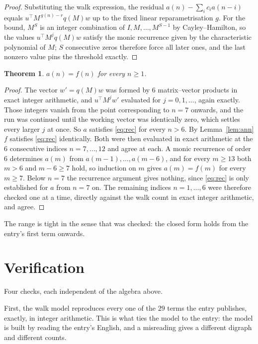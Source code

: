 \documentclass[11pt,a4paper]{article}
\theoremstyle{plain}
\newtheorem{theorem}{Theorem}
\theoremstyle{definition}
\begin{document}
\begin{proof}
Substituting the walk expression, the residual $a(n)-\sum_ic_ia(n-i)$ equals
$u^{\!\top}M^{\,g(n)-r}q(M)w$ up to the fixed linear reparametrisation $g$. For the bound,
$M^{S}$ is an integer combination of $I,M,\dots,M^{S-1}$ by Cayley--Hamilton, so the values
$u^{\!\top}M^{j}q(M)w$ satisfy the monic recurrence given by the characteristic polynomial of
$M$; $S$ consecutive zeros therefore force all later ones, and the last nonzero value pins the
threshold exactly.
\end{proof}

\begin{theorem}
$a(n)=f(n)$ for every $n\ge1$.
\end{theorem}

\begin{proof}
The vector $w'=q(M)w$ was formed by $6$ matrix--vector products in exact integer
arithmetic, and $u^{\!\top}M^{j}w'$ evaluated for $j=0,1,\dots$, again exactly. Those integers
vanish from the point corresponding to $n=7$ onwards, and the run was continued until the
working vector was identically zero, which settles every larger $j$ at once. So $a$ satisfies
\eqref{eq:rec} for every $n>6$. By Lemma~\ref{lem:ann} $f$ satisfies \eqref{eq:rec}
identically. Both were then evaluated in exact arithmetic at the $6$ consecutive indices
$n=7,\dots,12$ and agree at each. A monic recurrence of order $6$
determines $a(m)$ from $a(m-1),\dots,a(m-6)$, and for every $m\ge13$ both
$m>6$ and $m-6\ge7$ hold, so induction on $m$ gives $a(m)=f(m)$ for every
$m\ge7$.
Below $n=7$ the recurrence argument gives nothing, since \eqref{eq:rec} is only
established for $a$ from $n=7$ on. The remaining indices $n=1,\dots,6$ were
therefore checked one at a time, directly against the walk count in exact integer arithmetic,
and agree.
\end{proof}

The range is tight in the sense that was checked: the closed form holds from the entry's first term onwards.

\section{Verification}

Four checks, each independent of the algebra above.

First, the walk model reproduces every one of the $29$ terms the entry publishes,
exactly, in integer arithmetic. This is what ties the model to the entry: the model is built
by reading the entry's English, and a misreading gives a different digraph and different
counts.
\end{document}
